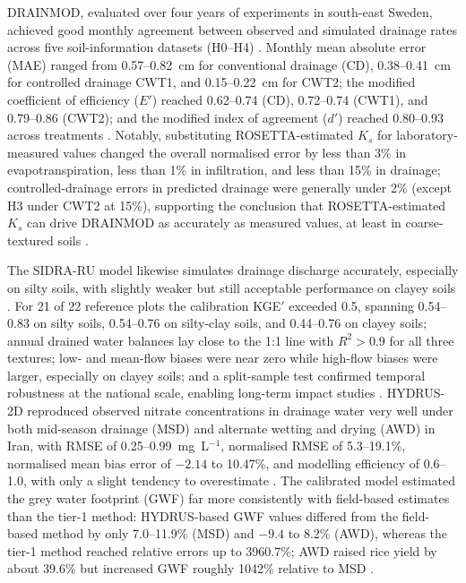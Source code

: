 \documentclass[11pt]{article}
\begin{document}
DRAINMOD, evaluated over four years of experiments in south-east Sweden,
achieved good monthly agreement between observed and simulated drainage rates
across five soil-information datasets (H0--H4) \parencite{Salazar2008}. Monthly
mean absolute error (MAE) ranged from 0.57--0.82~cm for conventional drainage
(CD), 0.38--0.41~cm for controlled drainage CWT1, and 0.15--0.22~cm for CWT2;
the modified coefficient of efficiency ($E'$) reached 0.62--0.74 (CD),
0.72--0.74 (CWT1), and 0.79--0.86 (CWT2); and the modified index of agreement
($d'$) reached 0.80--0.93 across treatments \parencite{Salazar2008}. Notably,
substituting ROSETTA-estimated $K_s$ for laboratory-measured values changed the
overall normalised error by less than 3\% in evapotranspiration, less than 1\%
in infiltration, and less than 15\% in drainage; controlled-drainage errors in
predicted drainage were generally under 2\% (except H3 under CWT2 at 15\%),
supporting the conclusion that ROSETTA-estimated $K_s$ can drive DRAINMOD as
accurately as measured values, at least in coarse-textured soils
\parencite{Salazar2008}.

The SIDRA-RU model likewise simulates drainage discharge accurately, especially
on silty soils, with slightly weaker but still acceptable performance on clayey
soils \parencite{Jeantet2021}. For 21 of 22 reference plots the calibration
KGE$'$ exceeded 0.5, spanning 0.54--0.83 on silty soils, 0.54--0.76 on
silty-clay soils, and 0.44--0.76 on clayey soils; annual drained water balances
lay close to the 1:1 line with $R^2>0.9$ for all three textures; low- and
mean-flow biases were near zero while high-flow biases were larger, especially
on clayey soils; and a split-sample test confirmed temporal robustness at the
national scale, enabling long-term impact studies \parencite{Jeantet2021}.
HYDRUS-2D reproduced observed nitrate concentrations in drainage water very well
under both mid-season drainage (MSD) and alternate wetting and drying (AWD) in
Iran, with RMSE of 0.25--0.99~mg~L$^{-1}$, normalised RMSE of 5.3--19.1\%,
normalised mean bias error of $-2.14$ to 10.47\%, and modelling efficiency of
0.6--1.0, with only a slight tendency to overestimate \parencite{Naderi2025}.
The calibrated model estimated the grey water footprint (GWF) far more
consistently with field-based estimates than the tier-1 method: HYDRUS-based GWF
values differed from the field-based method by only 7.0--11.9\% (MSD) and
$-9.4$ to 8.2\% (AWD), whereas the tier-1 method reached relative errors up to
3960.7\%; AWD raised rice yield by about 39.6\% but increased GWF roughly
1042\% relative to MSD \parencite{Naderi2025}.
\end{document}
